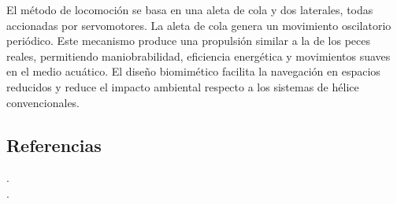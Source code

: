 El método de locomoción se basa en una aleta de cola y dos laterales, todas accionadas por servomotores.
La aleta de cola genera un movimiento oscilatorio periódico. Este mecanismo produce una propulsión 
similar a la de los peces reales, permitiendo maniobrabilidad, eficiencia energética y 
movimientos suaves en el medio acuático. El diseño biomimético facilita la navegación en 
espacios reducidos y reduce el impacto ambiental respecto a los sistemas de hélice 
convencionales.

\subsection*{Referencias}

\cite{Puig2025FishRobot} .\\
\cite{PortCastello2025PezRobot} .
